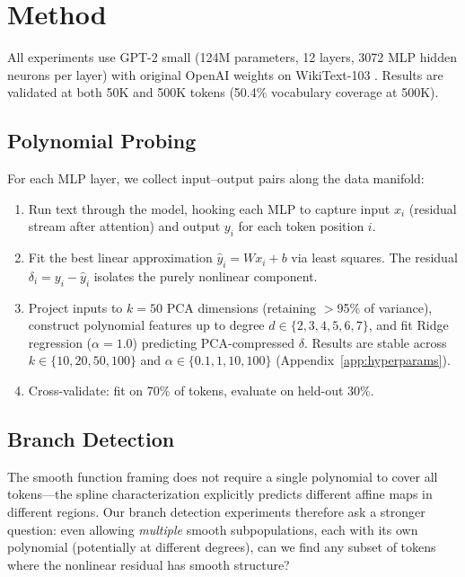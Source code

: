 \documentclass{article}
\begin{document}
\section{Method}

All experiments use GPT-2 small (124M parameters, 12 layers, 3072 MLP hidden neurons per layer)
\citep{radford2019language} with original OpenAI weights on WikiText-103 \citep{merity2016pointer}.
Results are validated at both 50K and 500K tokens (50.4\% vocabulary coverage at 500K).

\subsection{Polynomial Probing}

For each MLP layer, we collect input--output pairs along the data manifold:

\begin{enumerate}[leftmargin=*]
\item Run text through the model, hooking each MLP to capture input $x_i$ (residual stream
  after attention) and output $y_i$ for each token position $i$.
\item Fit the best linear approximation $\hat{y}_i = Wx_i + b$ via least squares.
  The residual $\delta_i = y_i - \hat{y}_i$ isolates the purely nonlinear component.
\item Project inputs to $k = 50$ PCA dimensions (retaining $>$95\% of variance), construct
  polynomial features up to degree $d \in \{2, 3, 4, 5, 6, 7\}$, and fit Ridge regression
  ($\alpha = 1.0$) predicting PCA-compressed $\delta$. Results are stable across
  $k \in \{10, 20, 50, 100\}$ and $\alpha \in \{0.1, 1, 10, 100\}$
  (Appendix~\ref{app:hyperparams}).
\item Cross-validate: fit on 70\% of tokens, evaluate on held-out 30\%.
\end{enumerate}

\subsection{Branch Detection}

The smooth function framing does not require a single polynomial to cover all tokens---the
spline characterization explicitly predicts different affine maps in different regions. Our
branch detection experiments therefore ask a stronger question: even allowing \emph{multiple}
smooth subpopulations, each with its own polynomial (potentially at different degrees), can we
find any subset of tokens where the nonlinear residual has smooth structure?
\end{document}
